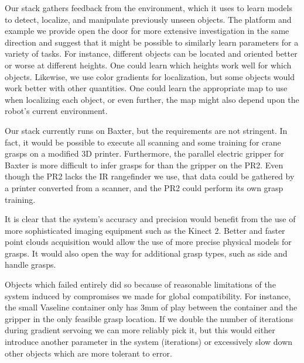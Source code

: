 \documentclass{article}
\begin{document}
Our stack gathers feedback from the environment, which it uses to learn models to detect, localize, and
manipulate previously unseen objects. The platform and example we provide
open the door for more extensive investigation in the same direction and
suggest that it might be possible to similarly learn parameters for a variety
of tasks. 
For instance, different objects can be located and oriented better or worse
at different heights. One could learn which heights work well for which objects.
Likewise, we use color gradients for localization, but some objects would work 
better with other quantities. One could learn the appropriate map to use when
localizing each object, or even further, the map might also depend upon the 
robot's current environment.

Our stack currently runs on Baxter, but the requirements are not stringent.
In fact, it would be possible to execute all scanning and some training for 
crane grasps on a modified 3D printer. Furthermore, the parallel electric gripper
for Baxter is more difficult to infer grasps for than the gripper on the PR2.
Even though the PR2 lacks the IR rangefinder we use, that data could be gathered
by a printer converted from a scanner, and the PR2 could perform its own grasp training.

It is clear that the system's accuracy and precision would benefit from the use of more
sophisticated imaging equipment such as the Kinect 2. Better and faster point clouds acquisition 
would allow the use of more precise physical models for grasps. It would also open the way for
additional grasp types, such as side and handle grasps.

Objects which failed entirely did so because of reasonable limitations of the
system induced by compromises we made for global compatibility. For instance,
the small Vaseline container only has 3mm of play between the container and the
gripper in the only feasible grasp location. If we double the number of iterations
during gradient servoing we can more reliably pick it, but this would either
introduce another parameter in the system (iterations) or excessively slow down
other objects which are more tolerant to error.
\end{document}
